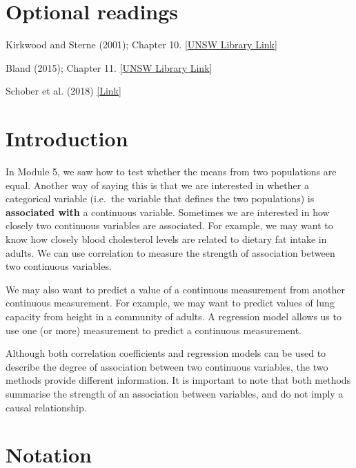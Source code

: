 \documentclass[
  a4paper,
]{memoir}
\begin{document}
\section*{Optional readings}\label{optional-readings-7}


Kirkwood and Sterne (2001); Chapter 10.
\href{http://er1.library.unsw.edu.au/er/cgi-bin/eraccess.cgi?url=https://ebookcentral.proquest.com/lib/unsw/detail.action?docID=624728}{{[}UNSW
Library Link{]}}

Bland (2015); Chapter 11.
\href{http://er1.library.unsw.edu.au/er/cgi-bin/eraccess.cgi?url=https://ebookcentral.proquest.com/lib/unsw/detail.action?docID=5891730}{{[}UNSW
Library Link{]}}

Schober et al. (2018)
\href{https://doi.org/10.1213/ANE.0000000000002864}{{[}Link{]}}

\section{Introduction}\label{introduction-7}

In Module 5, we saw how to test whether the means from two populations
are equal. Another way of saying this is that we are interested in
whether a categorical variable (i.e.~the variable that defines the two
populations) is \textbf{associated with} a continuous variable.
Sometimes we are interested in how closely two continuous variables are
associated. For example, we may want to know how closely blood
cholesterol levels are related to dietary fat intake in adults. We can
use correlation to measure the strength of association between two
continuous variables.

We may also want to predict a value of a continuous measurement from
another continuous measurement. For example, we may want to predict
values of lung capacity from height in a community of adults. A
regression model allows us to use one (or more) measurement to predict a
continuous measurement.

Although both correlation coefficients and regression models can be used
to describe the degree of association between two continuous variables,
the two methods provide different information. It is important to note
that both methods summarise the strength of an association between
variables, and do not imply a causal relationship.

\section{Notation}\label{notation}
\end{document}
